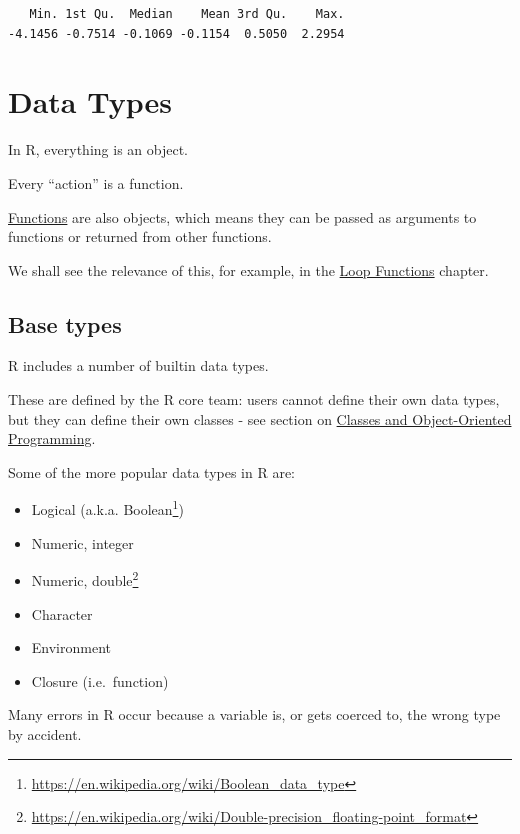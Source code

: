 \documentclass[
]{book}
\DeclareRobustCommand{\href}[2]{#2\footnote{\url{#1}}}
\providecommand{\tightlist}{%
  \setlength{\itemsep}{0pt}\setlength{\parskip}{0pt}}
\begin{document}
\begin{verbatim}
   Min. 1st Qu.  Median    Mean 3rd Qu.    Max. 
-4.1456 -0.7514 -0.1069 -0.1154  0.5050  2.2954 
\end{verbatim}

\hypertarget{types}{%
\chapter{Data Types}\label{types}}

\begin{rmdtip}
In R, everything is an object.

Every ``action'' is a function.

\protect\hyperlink{functions}{Functions} are also objects, which means
they can be passed as arguments to functions or returned from other
functions.

We shall see the relevance of this, for example, in the
\protect\hyperlink{loopfns}{Loop Functions} chapter.
\end{rmdtip}

\hypertarget{base-types}{%
\section{Base types}\label{base-types}}

R includes a number of builtin data types.

These are defined by the R core team: users cannot define their own data types, but they can define their own classes - see section on \protect\hyperlink{classes}{Classes and Object-Oriented Programming}.

Some of the more popular data types in R are:

\begin{itemize}
\tightlist
\item
  Logical (a.k.a. \href{https://en.wikipedia.org/wiki/Boolean_data_type}{Boolean})
\item
  Numeric, integer
\item
  Numeric, \href{https://en.wikipedia.org/wiki/Double-precision_floating-point_format}{double}
\item
  Character
\item
  Environment
\item
  Closure (i.e.~function)
\end{itemize}

\begin{rmdcaution}
Many errors in R occur because a variable is, or gets coerced to, the
wrong type by accident.
\end{rmdcaution}
\end{document}

